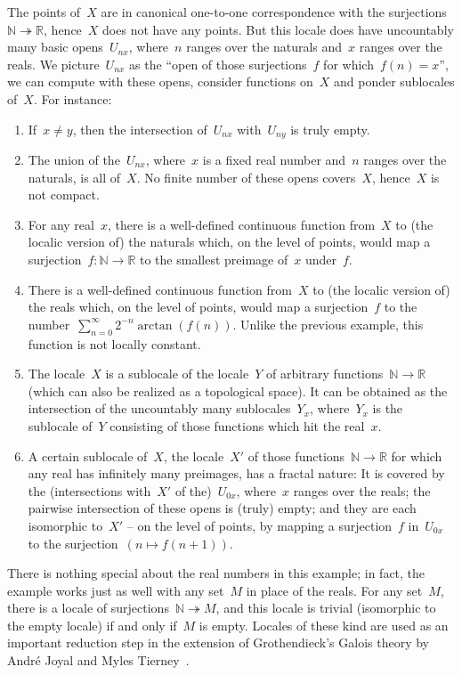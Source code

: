 \documentclass{ws-rv9x6}
\newcommand{\NN}{\mathbb{N}}
\newcommand{\RR}{\mathbb{R}}
\renewcommand{\_}{\mathpunct{.}}
\newcommand{\?}{\,{:}\,}
\begin{document}
The points of~$X$ are in canonical one-to-one correspondence with the
surjections~$\NN \twoheadrightarrow \RR$, hence~$X$ does not have any points.
But this locale does have uncountably many basic opens~$U_{nx}$, where~$n$
ranges over the naturals and~$x$ ranges over the reals. We picture~$U_{nx}$ as
the ``open of those surjections~$f$ for which~$f(n) = x$'', we can compute with
these opens, consider functions on~$X$ and ponder sublocales of~$X$. For instance:
\begin{enumerate}
\item If~$x \neq y$, then the intersection of~$U_{nx}$ with~$U_{ny}$
is truly empty.
\item The union of the~$U_{nx}$, where~$x$ is a fixed real
number and~$n$ ranges over the naturals, is all of~$X$. No finite number
of these opens covers~$X$, hence~$X$ is not compact.
\item For any real~$x$, there is a well-defined continuous function from~$X$ to
(the localic version of) the naturals which, on the level of points, would map
a surjection~$f : \NN \to \RR$ to the smallest preimage of~$x$ under~$f$.
\item There is a well-defined continuous function from~$X$ to (the localic
version of) the reals which, on the level of points, would map a surjection~$f$
to the number~$\sum_{n=0}^\infty 2^{-n} \arctan(f(n))$. Unlike the previous
example, this function is not locally constant.
\item\label{item:intersection-sublocales} The locale~$X$ is a sublocale of the
locale~$Y$ of arbitrary functions~$\NN \to \RR$ (which can also be realized as
a topological space). It can be obtained as the intersection of the uncountably
many sublocales~$Y_x$, where~$Y_x$ is the sublocale of~$Y$ consisting of those
functions which hit the real~$x$.
\item A certain sublocale of~$X$, the locale~$X'$ of those functions~$\NN \to
\RR$ for which any real has infinitely many preimages, has a fractal nature: It
is covered by the (intersections with~$X'$ of the)~$U_{0x}$, where~$x$ ranges over the reals; the pairwise
intersection of these opens is (truly) empty; and they are each isomorphic
to~$X'$ -- on the level of points, by mapping a surjection~$f$ in~$U_{0x}$ to
the surjection~$(n \mapsto f(n+1))$.
\end{enumerate}

There is nothing special about the real numbers in this example;
in fact, the example works just as well with any set~$M$ in place of the reals.
For any set~$M$, there is a locale of surjections~$\NN \twoheadrightarrow M$,
and this locale is trivial (isomorphic to the empty locale) if and only if~$M$
is empty. Locales of these kind are used as an important reduction step in the
extension of Grothendieck's Galois theory by André Joyal and
Myles Tierney~\cite[Section~V.3]{joyal-tierney:galois-theory}.
\end{document}
